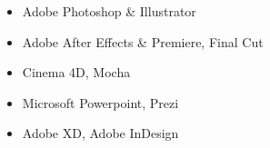 \MediaSkills 

\begin{itemize}
    \item Adobe Photoshop \& Illustrator
    \item Adobe After Effects \& Premiere, Final Cut
    \item Cinema 4D, Mocha
    \item Microsoft Powerpoint, Prezi
    \item Adobe XD, Adobe InDesign
\end{itemize}
